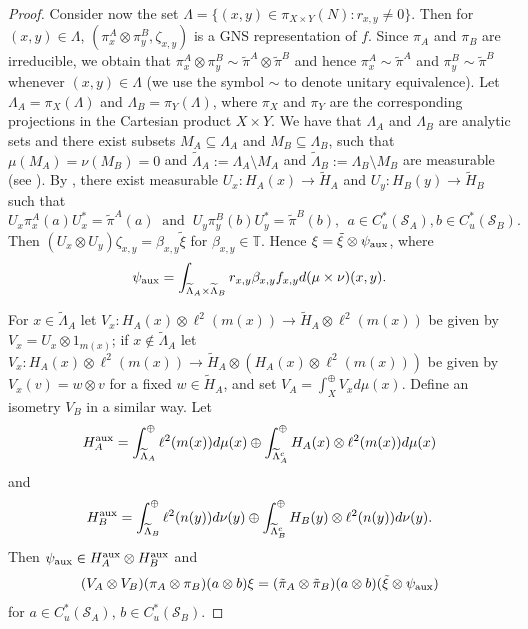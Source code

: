 \documentclass[11pt]{amsart}
\theoremstyle{definition}
\newcommand{\cl}[1]{\mathcal{#1}}
\providecommand{\wt}[1]{\widetilde{#1}}
\begin{document}
\begin{proof}
  Consider now  the set $\Lambda=\{(x,y)\in\pi_{X\times Y}(N): r_{x,y}\ne 0\}$. Then for $(x,y)\in\Lambda$, $(\pi_x^A\otimes\pi_y^B, \zeta_{x,y})$ is a GNS representation of $f$. 
Since $\pi_A$ and $\pi_B$ are irreducible, we obtain that $\pi_x^A\otimes\pi_y^B\sim\tilde\pi^A\otimes\tilde\pi^B$  
  and hence $\pi_x^A\sim \tilde\pi^A$ and $\pi_y^B\sim\tilde\pi^B$ 
  whenever $(x,y)\in \Lambda$ (we use the symbol $\sim$ to denote unitary 
  equivalence). Let $\Lambda_A=\pi_X(\Lambda)$ and $\Lambda_B=\pi_Y(\Lambda)$, where $\pi_X$ and $\pi_Y$ are the corresponding projections in the Cartesian product $X\times Y$. We have that $\Lambda_A$ and $\Lambda_B$ are analytic sets and there exist subsets $M_A\subseteq \Lambda_A$ and $M_B\subseteq \Lambda_B$, such that $\mu(M_A)=\nu(M_B)=0$ and $\wt\Lambda_A:=\Lambda_A\setminus M_A$ and $\wt\Lambda_B:=\Lambda_B\setminus M_B$ are measurable (see \cite[Appendix]{takesaki}). 
  By \cite[p. 166, Lemme 2]{dixmier_von_neumann}, 
  there exist measurable $U_x: H_A(x)\to \tilde H_A$ and $U_y: H_B(y)\to \tilde H_B$ such that
$$U_x\pi_x^A(a)U_x^*=\tilde\pi^A(a) \ \mbox{ and } \ 
U_y\pi_y^B(b)U_y^*=\tilde\pi^B(b), \ \ 
a\in C^*_u(\cl S_A), b\in C^*_u(\cl S_B).$$ 
Then $(U_x\otimes U_y)\zeta_{x,y}=\beta_{x,y}\tilde\xi$ for $\beta_{x,y}\in\mathbb T$.
Hence $\xi=\tilde\xi\otimes\psi_{\rm aux}$, where 
$$\psi_{\rm aux} = \int_{\wt\Lambda_A \times \wt\Lambda_B} r_{x,y}\beta_{x,y}f_{x,y}d(\mu\times \nu)(x,y).$$

For $x\in\wt\Lambda_A$ let $V_x: H_A(x)\otimes\ell^2(m(x))\to\tilde H_A\otimes\ell^2(m(x))$ be given by $V_x = U_x\otimes 1_{m(x)}$; if $x\not\in \wt\Lambda_A$ let $V_x: H_A(x)\otimes\ell^2(m(x))\to \tilde H_A\otimes (H_A(x)\otimes\ell^2(m(x)))$ be given by 
$V_x(v) = w\otimes v$ for a fixed $w\in\tilde H_A$, and set $V_A=\int_X^\oplus V_x d\mu(x)$. 
Define an isometry $V_B$ in a similar way. 
Let 
$$H_A^{\rm aux}=\int_{\wt\Lambda_A}^{\oplus}\ell^2(m(x))d\mu(x)\oplus \int_{\wt\Lambda_A^c}^\oplus H_A(x)\otimes\ell^2(m(x))d\mu(x)$$ 
and 
$$H_B^{\rm aux}=\int_{\wt\Lambda_B}^{\oplus}\ell^2(n(y))d\nu(y)\oplus \int_{\wt\Lambda_B^c}^{\oplus}H_B(y)\otimes \ell^2(n(y))d\nu(y).$$ 
Then
$\psi_{\rm aux}\in H_A^{\rm aux}\otimes H_B^{\rm aux}$ and
$$(V_A\otimes V_B)(\pi_A\otimes\pi_B)(a\otimes b)\xi=(\tilde\pi_A\otimes\tilde\pi_B)(a\otimes b)(\tilde\xi\otimes \psi_{\rm aux})$$ for $a\in C^*_u(\cl S_A)$, $b\in C^*_u(\cl S_B).$    
\end{proof}
\end{document}
